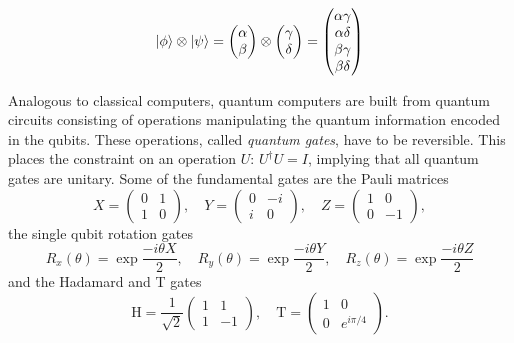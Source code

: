 $$
\left\vert{\phi}\right\rangle \otimes \left\vert{\psi}\right\rangle=
\begin{pmatrix} \alpha \\ \beta\end{pmatrix}
  \otimes \begin{pmatrix} \gamma \\ \delta\end{pmatrix} = \begin{pmatrix} \alpha \gamma \\ \alpha \delta \\ \beta \gamma \\ \beta \delta \end{pmatrix}
$$

Analogous to classical computers, quantum computers are built from quantum circuits consisting of operations manipulating the quantum information encoded in the qubits. These operations, called \textit{quantum gates}, have to be reversible. This places the constraint on an operation $U$: $U^{\dagger}U = I$, implying that all quantum gates are unitary. Some of the fundamental gates are the Pauli matrices \begin{equation}
X=\left(\begin{array}{ll}
0 & 1 \\
1 & 0
\end{array}\right), \quad Y=\left(\begin{array}{cc}
0 & -i \\
i & 0
\end{array}\right), \quad Z=\left(\begin{array}{cc}
1 & 0 \\
0 & -1
\end{array}\right),
\end{equation}
the single qubit rotation gates
\begin{equation}
R_{x}(\theta)=\exp{\frac{-i \theta X}{2}}, \quad
R_{y}(\theta)=\exp{\frac{-i \theta Y}{2}}, \quad
R_{z}(\theta)=\exp{\frac{-i \theta Z}{2}}
\end{equation}
and the Hadamard and T gates \cite{nielsen}
\begin{equation}
\mathrm{H}=\frac{1}{\sqrt{2}}\left(\begin{array}{cc}
1 & 1 \\
1 & -1
\end{array}\right), \quad \mathrm{T}=\left(\begin{array}{cc}
1 & 0 \\
0 & e^{i \pi / 4}
\end{array}\right).
\end{equation}

